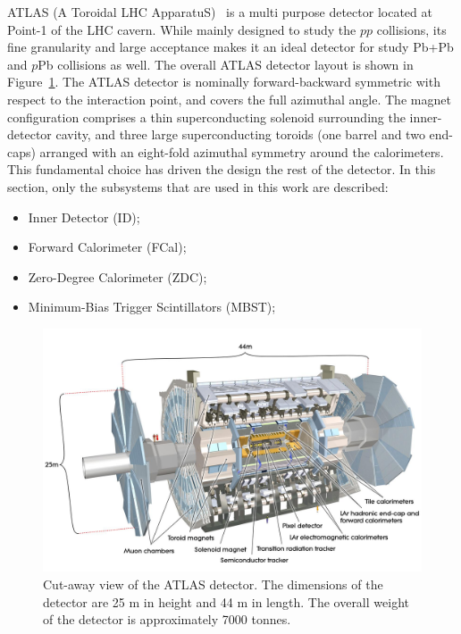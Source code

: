 ATLAS (A Toroidal LHC ApparatuS)~\cite{Aad:2008zzm} is a multi purpose detector located at Point-1 of the LHC cavern. While mainly designed to study the $pp$ collisions, its fine granularity and large acceptance makes it an ideal detector for study Pb+Pb and $p$Pb collisions as well. The overall ATLAS detector layout is shown in Figure~\ref{fig:detector_ATLAS_detector}. The ATLAS detector is nominally forward-backward symmetric with respect to the interaction point, and covers the full azimuthal angle. The magnet configuration comprises a thin superconducting solenoid surrounding the inner-detector cavity, and three large superconducting toroids (one barrel and two end-caps) arranged with an eight-fold azimuthal symmetry around the calorimeters. This fundamental choice has driven the design the rest of the detector. In this section, only the subsystems that are used in this work are described:
\begin{itemize}
\item Inner Detector (ID);
\item Forward Calorimeter (FCal);
\item Zero-Degree Calorimeter (ZDC);
\item Minimum-Bias Trigger Scintillators (MBST);
\end{itemize}

\begin{figure}[H]
\centering
\includegraphics[width=.95\linewidth]{figs/chapter_detector/ATLAS_detector.jpg}
\caption{Cut-away view of the ATLAS detector. The dimensions of the detector are 25 m in height and 44 m in length. The overall weight of the detector is approximately 7000 tonnes.}
\label{fig:detector_ATLAS_detector}
\end{figure}



